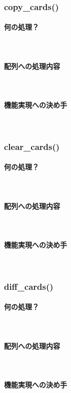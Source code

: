 \documentclass[11pt,a4paper, uplatex]{jsarticle}
\begin{document}
\subsubsection{copy\_cards()}
\paragraph{何の処理？}\mbox{}\\
\paragraph{配列への処理内容}\mbox{}\\
\paragraph{機能実現への決め手}\mbox{}\\
%
\subsubsection{clear\_cards()}
\paragraph{何の処理？}\mbox{}\\
\paragraph{配列への処理内容}\mbox{}\\
\paragraph{機能実現への決め手}\mbox{}\\
%
\subsubsection{diff\_cards()}
\paragraph{何の処理？}\mbox{}\\
\paragraph{配列への処理内容}\mbox{}\\
\paragraph{機能実現への決め手}\mbox{}\\
%
\end{document}
